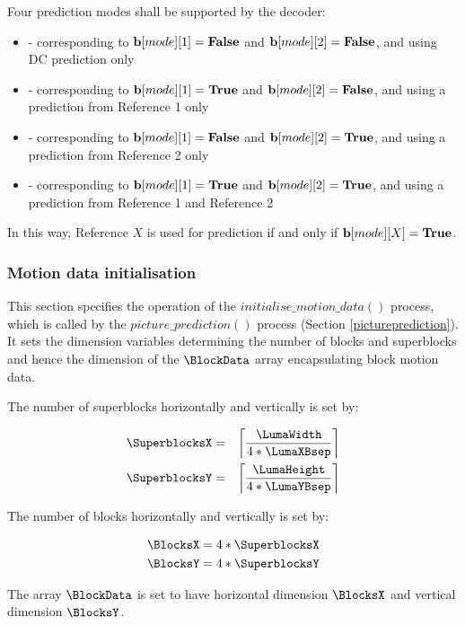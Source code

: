 Four prediction modes shall be supported by the decoder: 

\begin{itemize}
\item \Intra - corresponding to ${\bf b}[mode][1]=\text{\bf{False}}$ and ${\bf b}[mode][2]=\text{\bf{False}}$, and using DC prediction only
\item \RefOneOnly - corresponding to ${\bf b}[mode][1]=\text{\bf{True}}$ and ${\bf b}[mode][2]=\text{\bf{False}}$, and using a prediction from Reference 1 only
\item \RefTwoOnly - corresponding to ${\bf b}[mode][1]=\text{\bf{False}}$ and ${\bf b}[mode][2]=\text{\bf{True}}$, and using a prediction from Reference 2 only
\item \RefOneAndTwo - corresponding to ${\bf b}[mode][1]=\text{\bf{True}}$ and ${\bf b}[mode][2]=\text{\bf{True}}$, and using a prediction from Reference 1 and Reference 2
\end{itemize}

In this way, Reference $X$ is used for prediction if and only if ${\bf b}[mode][X]=\text{\bf{True}}$. 

\subsubsection{Motion data initialisation}

\label{motioninit}

This section specifies the operation of the $initialise\_motion\_data()$ process, which is called by the 
$picture\_prediction()$ process (Section \ref{pictureprediction}). It sets the dimension variables determining the
number of blocks and superblocks and hence the dimension of the $\BlockData$ array encapsulating block motion
data.

The number of superblocks horizontally and vertically is set by:

\begin{eqnarray*}
\SuperblocksX & = & \left\lceil \frac{\LumaWidth}{4*\LumaXBsep} \right\rceil  \\
\SuperblocksY & = & \left\lceil \frac{\LumaHeight}{4*\LumaYBsep} \right\rceil 
\end{eqnarray*}

The number of blocks horizontally and vertically is set by:

\begin{eqnarray*}
\BlocksX = 4*\SuperblocksX \\
\BlocksY = 4*\SuperblocksY
\end{eqnarray*}

The array $\BlockData$ is set to have horizontal dimension $\BlocksX$ and vertical dimension $\BlocksY$.

